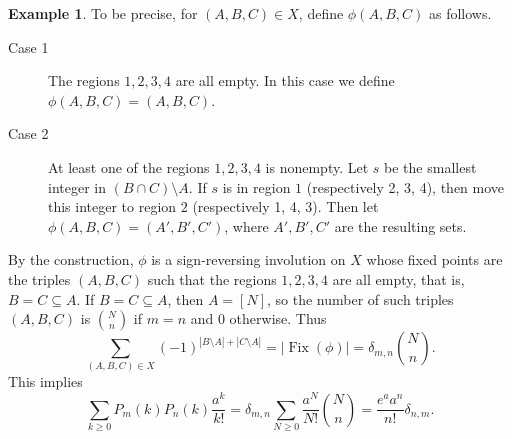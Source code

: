 \documentclass[oneside]{book}
\numberwithin{equation}{section}
\theoremstyle{definition}
\newtheorem{exam}[thm]{Example}
\newcommand\Fix{\operatorname{Fix}}
\begin{document}
\begin{exam}
To be precise, for \( (A,B,C)\in X \), define \( \phi(A,B,C) \) as
follows.
\begin{description}
\item[Case 1] The regions \( 1,2,3,4 \) are all empty. In this case we define
  \( \phi(A,B,C) = (A,B,C) \).
\item[Case 2] At least one of the regions \( 1,2,3,4 \) is nonempty.
  Let \( s \) be the smallest integer in \( (B\cap C) \setminus A \).
  If \( s \) is in region \( 1 \) (respectively 2, 3, 4), then move
  this integer to region \( 2 \) (respectively 1, 4, 3). Then let
  \( \phi(A,B,C) = (A',B',C') \), where \( A',B',C' \) are the
  resulting sets.
\end{description}

By the construction, \( \phi \) is a sign-reversing involution on
\( X \) whose fixed points are the triples \( (A,B,C) \) such that the
regions \( 1,2,3,4 \) are all empty, that is, \( B=C \subseteq A \).
If \( B=C \subseteq A \), then \( A = [N] \),
so the number of such triples \( (A,B,C) \) is
\( \binom{N}{n} \) if \( m=n \)
and \( 0 \) otherwise.
Thus
\[
  \sum_{(A,B,C)\in X} (-1)^{|B\setminus A| + |C\setminus A|} =
  |\Fix(\phi)| = \delta_{m,n} \binom{N}{n}.
\]
This implies
\[
  \sum_{k\ge 0}  P_m(k) P_n(k) \frac{a^k}{k!}
  = \delta_{m,n} \sum_{N\ge0} \frac{a^N}{N!} \binom{N}{n}
  = \frac{e^a a^n}{n!} \delta_{n,m}.
\]
\end{exam}







\end{document}
